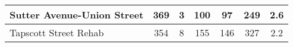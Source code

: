 {\begin{tabular}{l|c|c|c|c|c|c|}
                                             \\ \hline\multicolumn{1}{|l|}{\cellcolor{ccteallight}Sutter Avenue-Union Street}        & 369                                                   & 3                            & 100                                                   & 97                                                           & 249                                                                & 2.6                                                                \\ \hline\multicolumn{1}{|l|}{\cellcolor{ccteallight}Tapscott Street Rehab}        & 354                                                   & 8                            & 155                                                   & 146                                                           & 327                                                                & 2.2                                                                \\ \hline
    \end{tabular}
    }
    